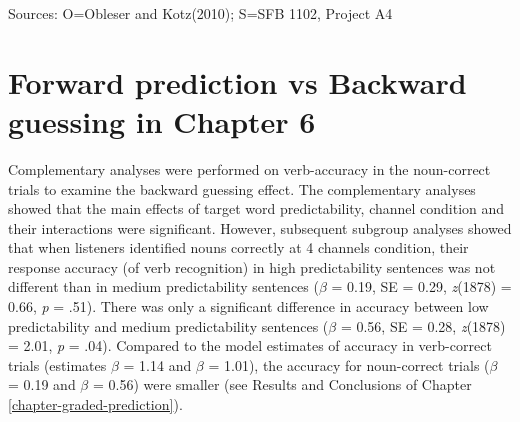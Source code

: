 \documentclass[a4paper, nobind]{templates/ociamthesis}
\begin{document}
\noindent Sources: O=Obleser and Kotz(2010); S=SFB 1102, Project A4

\hypertarget{appendix-B}{%
\chapter{Forward prediction vs Backward guessing in Chapter 6}\label{appendix-B}}

Complementary analyses were performed on verb-accuracy in the noun-correct trials to examine the backward guessing effect.
The complementary analyses showed that the main effects of target word predictability, channel condition and their interactions were significant.
However, subsequent subgroup analyses showed that when listeners identified nouns correctly at 4 channels condition,
their response accuracy (of verb recognition) in high predictability sentences was not different than in medium predictability sentences (\(\beta\) = 0.19, SE = 0.29, \emph{z}(1878) = 0.66, \emph{p} = .51).
There was only a significant difference in accuracy between low predictability and medium predictability sentences (\(\beta\) = 0.56, SE = 0.28, \emph{z}(1878) = 2.01, \emph{p} = .04).
Compared to the model estimates of accuracy in verb-correct trials (estimates \(\beta\) = 1.14 and \(\beta\) = 1.01),
the accuracy for noun-correct trials (\(\beta\) = 0.19 and \(\beta\) = 0.56) were smaller (see Results and Conclusions of Chapter \ref{chapter-graded-prediction}).
\end{document}
